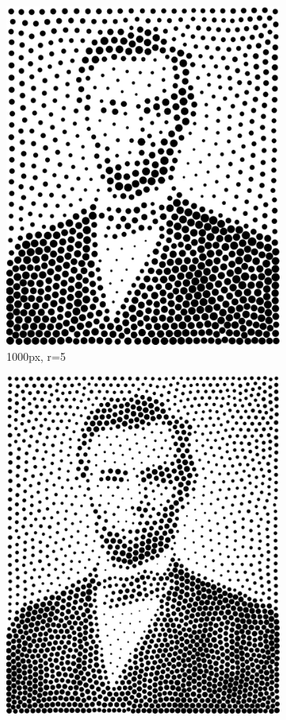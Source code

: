 \documentclass[11pt]{article}
\begin{document}
\begin{figure}[H]
\begin{subfigure}[b]{0.2\linewidth}
		\includegraphics[width=\linewidth]{pix/vr_AL_1000_r5.png}
		\caption{1000px, r=5}
	\end{subfigure}
	\begin{subfigure}[b]{0.2\linewidth}
		\includegraphics[width=\linewidth]{pix/vr_AL_2000_r5.png}

\end{subfigure}
\end{figure}
\end{document}
